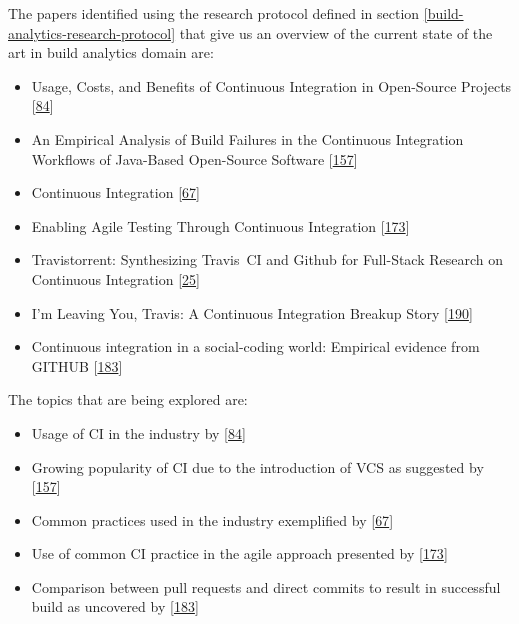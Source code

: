 \documentclass[]{book}
\providecommand{\tightlist}{%
  \setlength{\itemsep}{0pt}\setlength{\parskip}{0pt}}
\begin{document}
The papers identified using the research protocol defined in section
\ref{build-analytics-research-protocol} that give us an overview of the
current state of the art in build analytics domain are:

\begin{itemize}
\tightlist
\item
  Usage, Costs, and Benefits of Continuous Integration in Open-Source
  Projects {[}\protect\hyperlink{ref-hilton2016usage}{84}{]}
\item
  An Empirical Analysis of Build Failures in the Continuous Integration
  Workflows of Java-Based Open-Source Software
  {[}\protect\hyperlink{ref-rausch2017empirical}{157}{]}
\item
  Continuous Integration
  {[}\protect\hyperlink{ref-fowler2006continuous}{67}{]}
\item
  Enabling Agile Testing Through Continuous Integration
  {[}\protect\hyperlink{ref-stolberg2009enabling}{173}{]}
\item
  Travistorrent: Synthesizing Travis~CI and Github for Full-Stack
  Research on Continuous Integration
  {[}\protect\hyperlink{ref-beller2017travistorrent}{25}{]}
\item
  I'm Leaving You, Travis: A Continuous Integration Breakup Story
  {[}\protect\hyperlink{ref-widder2018m}{190}{]}
\item
  Continuous integration in a social-coding world: Empirical evidence
  from GITHUB {[}\protect\hyperlink{ref-vasilescu2014continuous}{183}{]}
\end{itemize}

The topics that are being explored are:

\begin{itemize}
\tightlist
\item
  Usage of CI in the industry by
  {[}\protect\hyperlink{ref-hilton2016usage}{84}{]}
\item
  Growing popularity of CI due to the introduction of VCS as suggested
  by {[}\protect\hyperlink{ref-rausch2017empirical}{157}{]}
\item
  Common practices used in the industry exemplified by
  {[}\protect\hyperlink{ref-fowler2006continuous}{67}{]}
\item
  Use of common CI practice in the agile approach presented by
  {[}\protect\hyperlink{ref-stolberg2009enabling}{173}{]}
\item
  Comparison between pull requests and direct commits to result in
  successful build as uncovered by
  {[}\protect\hyperlink{ref-vasilescu2014continuous}{183}{]}
\end{itemize}
\end{document}
